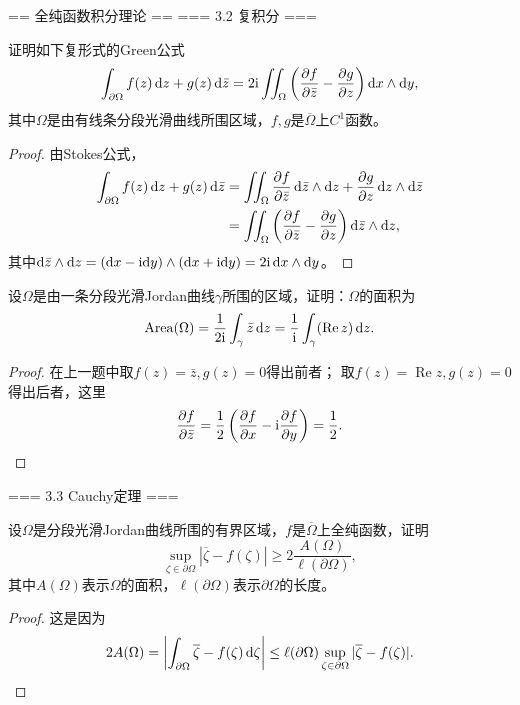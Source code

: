 == 全纯函数积分理论 ==
=== 3.2 复积分 ===
\begin{7}
    证明如下复形式的Green公式
    \[\int_{\partial\Omega} f(z)\,{\rm d}z+g(z)\,{\rm d}\bar{z}
    =2{\rm i}\iint_{\Omega}\left(\frac{\partial f}{\partial \bar{z}}
    -\frac{\partial g}{\partial z}\right){\rm d}x\wedge{\rm d}y,\]
    其中$\Omega$是由有线条分段光滑曲线所围区域，$f,g$是$\overline{\Omega}$上$C^1$函数。
\end{7}
\begin{proof}
    由Stokes公式，
    \begin{align*}
        \int_{\partial\Omega}f(z)\,{\rm d}z+g(z)\,{\rm d}\bar{z}
        &=\iint_{\Omega}\frac{\partial f}{\partial \bar{z}}\,{\rm d}\bar{z}\wedge{\rm d}z
        +\frac{\partial g}{\partial z}\,{\rm d}z\wedge{\rm d}\bar{z}\\
        &=\iint_{\Omega}\left(\frac{\partial f}{\partial \bar{z}}
        -\frac{\partial g}{\partial z}\right){\rm d}\bar{z}\wedge{\rm d}z,
    \end{align*}
    其中${\rm d}\bar{z}\wedge{\rm d}z=({\rm d}x-{\rm i}{\rm d}y)\wedge({\rm d}x+{\rm i}{\rm d}y)
    =2{\rm i}\,{\rm d}x\wedge{\rm d}y$。
\end{proof}
\begin{8}
    设$\Omega$是由一条分段光滑Jordan曲线$\gamma$所围的区域，证明：$\Omega$的面积为
    \[\operatorname{Area}(\Omega)=\frac{1}{2{\rm i}}\int_\gamma\bar{z}\,{\rm d}z
    =\frac{1}{{\rm i}}\int_\gamma(\operatorname{Re}z)\,{\rm d}z.\]
\end{8}
\begin{proof}
    在上一题中取$f(z)=\bar{z}, g(z)=0$得出前者；
    取$f(z)=\operatorname{Re}z,g(z)=0$得出后者，这里
    \[\frac{\partial f}{\partial \bar{z}}=\frac{1}{2}\left(\frac{\partial f}{\partial x}
    -{\rm i}\frac{\partial f}{\partial y}\right)=\frac{1}{2}.\qedhere\]
\end{proof}

=== 3.3 Cauchy定理 ===
\begin{7}
    设$\Omega$是分段光滑Jordan曲线所围的有界区域，$f$是$\overline{\Omega}$上全纯函数，证明
    \[\sup_{\zeta\in\partial\Omega}|\overline{\zeta}-f(\zeta)|\ge2\frac{A(\Omega)}{\ell(\partial\Omega)},\]
    其中$A(\Omega)$表示$\Omega$的面积，$\ell(\partial\Omega)$表示$\partial\Omega$的长度。
\end{7}
\begin{proof}
    这是因为
    \[2A(\Omega)=\left|\int_{\partial\Omega}\overline{\zeta}-f(\zeta)\,{\rm d}\zeta\right|
    \le\ell(\partial\Omega)\sup_{\zeta\in\partial\Omega}|\overline{\zeta}-f(\zeta)|.\qedhere\]
\end{proof}
    
